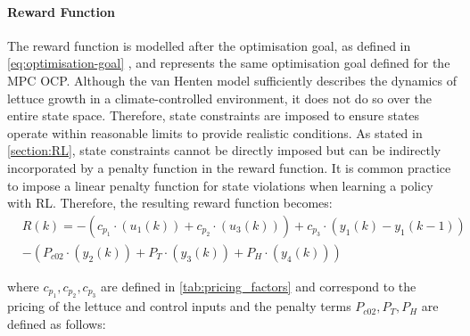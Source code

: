 \paragraph{Reward Function}\label{paragraph:reward-function}
The reward function is modelled after the optimisation goal, as defined in \autoref{eq:optimisation-goal} , and represents the same optimisation goal defined for the MPC OCP. Although the van Henten model sufficiently describes the dynamics of lettuce growth in a climate-controlled environment, it does not do so over the entire state space. Therefore, state constraints are imposed to ensure states operate within reasonable limits to provide realistic conditions. As stated in \autoref{section:RL}, state constraints cannot be directly imposed but can be indirectly incorporated by a penalty function in the reward function. It is common practice to impose a linear penalty function for state violations when learning a policy with RL. Therefore, the resulting reward function becomes:
\begin{equation}\label{eq:reward_fn}
    \begin{aligned}
        & R(k)  =  - (c_{p_1} \cdot (u_1(k)) + c_{p_2} \cdot (u_3(k))) + c_{p_3} \cdot (y_1(k)- y_1(k-1))\\ 
        & - (P_{c02} \cdot (y_2(k) ) + P_T \cdot (y_3(k)) + P_H \cdot (y_4(k)) )
    \end{aligned}
\end{equation}

where $c_{p_1},c_{p_2},c_{p_3}$ are defined in \autoref{tab:pricing_factors} and correspond to the pricing of the lettuce and control inputs and the penalty terms $P_{c02},P_T,P_H$ are defined as follows:

